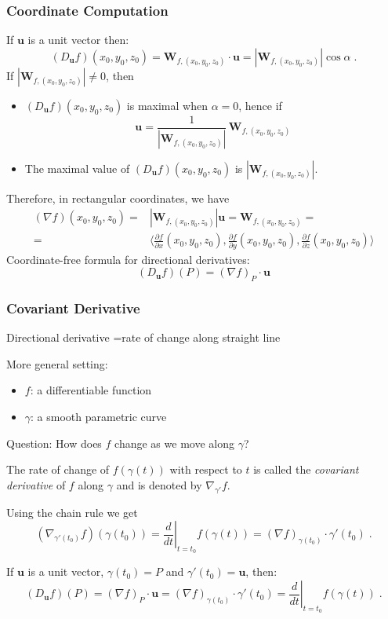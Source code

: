 \begin{frame}
  \frametitle{Coordinate Computation}

  If $\textbf{u}$ is a unit vector then:
%
$$
  (D_{\textbf{u}}f)(x_0,y_0,z_0) =  \textbf{W}_{f,(x_0,y_0,z_0)} \cdot \textbf{u} = |\textbf{W}_{f,(x_0,y_0,z_0)}| \cos\alpha \; .
$$
%
\pause If $|\textbf{W}_{f,(x_0,y_0,z_0)}|\neq 0$, then
%
\begin{itemize}
  \item $(D_{\textbf{u}}f)(x_0,y_0,z_0)$ is maximal when $\alpha = 0$, hence if
      $$\textbf{u} = \frac{1}{|\textbf{W}_{f,(x_0,y_0,z_0)}|}\,\textbf{W}_{f,(x_0,y_0,z_0)}$$
%
  \item The maximal value of $(D_{\textbf{u}}f)(x_0,y_0,z_0)$ is $|\textbf{W}_{f,(x_0,y_0,z_0)}|$.
\end{itemize}

\pause Therefore, in rectangular coordinates, we have
%
\begin{align*}
  (\nabla f)(x_0,y_0,z_0) = & |\textbf{W}_{f,(x_0,y_0,z_0)}| \textbf{u} = \textbf{W}_{f,(x_0,y_0,z_0)} = \\
  = & \langle \frac{\partial f}{\partial x}(x_0,y_0,z_0) , \frac{\partial f}{\partial y}(x_0,y_0,z_0), \frac{\partial f}{\partial z}(x_0,y_0,z_0) \rangle
\end{align*}
%
\pause Coordinate-free formula for directional derivatives:
%
$$(D_{\textbf{u}} f)(P) = (\nabla f)_P \cdot \textbf{u}$$
\end{frame}

\begin{frame}
  \frametitle{Covariant Derivative}

  Directional derivative =rate of change along straight line

\pause
  More general setting:
  \begin{itemize}
    \item $f$: a differentiable function
    \item $\gamma$: a smooth parametric curve
  \end{itemize}

\pause
Question: How does $f$ change as we move along $\gamma$?

\begin{definition}
  The rate of change of $f(\gamma(t))$ with respect to $t$ is called the \emph{covariant derivative} of $f$ along $\gamma$ and is denoted by $\nabla_{\gamma'} f$.
\end{definition}

\pause
Using the chain rule we get
%
$$(\nabla_{\gamma'(t_0)} f) (\gamma(t_0)) = \left. \frac{d}{dt}\right|_{t=t_0} f(\gamma(t)) = (\nabla f)_{\gamma(t_0)} \cdot \gamma'(t_0) \; .$$
%

\pause
If $\textbf{u}$ is a unit vector,  $\gamma(t_0) = P$ and $\gamma'(t_0) = \textbf{u}$, then:
%
$$(D_{\textbf{u}} f)(P) = (\nabla f)_P \cdot \textbf{u} =
(\nabla f)_{\gamma(t_0)} \cdot \gamma'(t_0) = \left. \frac{d}{dt}\right|_{t=t_0} f(\gamma(t))\; .$$
%
\end{frame}

